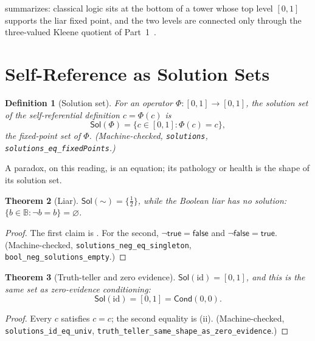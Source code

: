 \documentclass[11pt,a4paper]{article}
\newtheorem{theorem}{Theorem}[section]
\newtheorem{definition}[theorem]{Definition}
\newcommand{\negc}{\mathord{\sim}}
\newcommand{\Cond}{\mathsf{Cond}}
\newcommand{\Sol}{\mathsf{Sol}}
\newcommand{\Bool}{\mathbb{B}}
\begin{document}
 summarizes: classical logic sits at the bottom of a
tower whose top level $[0,1]$ supports the liar fixed point, and the
two levels are connected only through the three-valued Kleene quotient
of Part~1~\cite{part1,priest1979,belnap1977}.

\section{Self-Reference as Solution Sets}
\label{sec:solutions}

\begin{definition}[Solution set]
\label{def:solutions}
For an operator $\Phi : [0,1] \to [0,1]$, the \emph{solution set} of
the self-referential definition $c = \Phi(c)$ is
\[
  \Sol(\Phi) = \{c \in [0,1] : \Phi(c) = c\},
\]
the fixed-point set of $\Phi$.
(Machine-checked, \texttt{solutions},
\texttt{solutions\_eq\_fixedPoints}.)
\end{definition}

A paradox, on this reading, is an equation; its pathology or health is
the shape of its solution set.

\begin{theorem}[Liar]
\label{thm:liar-sol}
$\Sol(\negc) = \{\tfrac12\}$, while the Boolean liar has no solution:
$\{b \in \Bool : \lnot b = b\} = \varnothing$.
\end{theorem}
\begin{proof}
The first claim is .
For the second, $\lnot\mathsf{true} = \mathsf{false}$ and
$\lnot\mathsf{false} = \mathsf{true}$.
(Machine-checked, \texttt{solutions\_neg\_eq\_singleton},
\texttt{bool\_neg\_solutions\_empty}.)
\end{proof}

\begin{theorem}[Truth-teller and zero evidence]
\label{thm:truth-teller}
$\Sol(\mathrm{id}) = [0,1]$, and this is the same set as zero-evidence
conditioning:
\[
  \Sol(\mathrm{id}) = [0,1] = \Cond(0,0).
\]
\end{theorem}
\begin{proof}
Every $c$ satisfies $c = c$; the second equality is
(ii).
(Machine-checked, \texttt{solutions\_id\_eq\_univ},
\texttt{truth\_teller\_same\_shape\_as\_zero\_evidence}.)
\end{proof}
\end{document}
